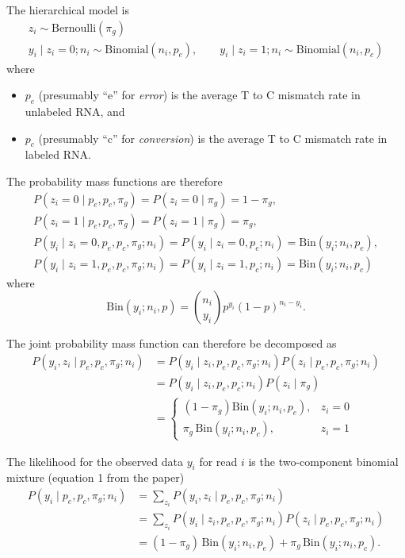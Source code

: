 \documentclass[11pt]{article}
\begin{document}
The hierarchical model is
\[
\begin{gathered}
z_i \sim \mathrm{Bernoulli}(\pi_g) \\
y_i \mid z_i=0; n_i \sim \mathrm{Binomial}(n_i,p_e),
\qquad
y_i \mid z_i=1; n_i \sim \mathrm{Binomial}(n_i,p_c)
\end{gathered}
\]
where \begin{itemize}
    \item $p_e$ (presumably ``e'' for \emph{error}) is the average T to C mismatch rate in unlabeled RNA, and
    \item $p_c$ (presumably ``c'' for \emph{conversion}) is the average T to C mismatch rate in labeled RNA.
\end{itemize}
The probability mass functions are therefore
\[
\begin{gathered}
P(z_i = 0 \mid p_e, p_c, \pi_g) = P(z_i = 0 \mid \pi_g) = 1 - \pi_g, \\
P(z_i = 1 \mid p_e, p_c, \pi_g) = P(z_i = 1 \mid \pi_g) = \pi_g, \\
P(y_i \mid z_i = 0, p_e, p_c, \pi_g; n_i) = P(y_i \mid z_i = 0, p_e; n_i) = \mathrm{Bin}(y_i; n_i, p_e), \\
P(y_i \mid z_i = 1, p_e, p_c, \pi_g; n_i) = P(y_i \mid z_i = 1, p_c; n_i) = \mathrm{Bin}(y_i; n_i, p_c)
\end{gathered}
\]
where
\[
\mathrm{Bin}(y_i;n_i,p) = \binom{n_i}{y_i} p^{y_i} (1 - p)^{n_i - y_i}.
\]

The joint probability mass function can therefore be decomposed as
\[
\begin{aligned}
P(y_i, z_i \mid p_e, p_c, \pi_g; n_i)
&= P(y_i \mid z_i, p_e, p_c, \pi_g; n_i) P(z_i \mid p_e, p_c, \pi_g; n_i) \\
&= P(y_i \mid z_i, p_e, p_c; n_i) P(z_i \mid \pi_g) \\
&= \begin{cases}
    (1 - \pi_g) \mathrm{Bin}(y_i; n_i, p_e), & z_i = 0 \\
    \pi_g \, \mathrm{Bin}(y_i; n_i, p_c), & z_i = 1
\end{cases}
\end{aligned}
\]

The likelihood for the observed data $y_i$ for read $i$ is the two-component binomial mixture (equation 1 from the paper)
\[
\begin{aligned}
P(y_i \mid p_e, p_c, \pi_g; n_i)
&=
\sum_{z_i} P(y_i, z_i \mid p_e, p_c, \pi_g; n_i) \\
&=
\sum_{z_i} P(y_i \mid z_i, p_e, p_c, \pi_g; n_i) P(z_i \mid p_e, p_c, \pi_g; n_i) \\
&= 
(1 - \pi_g)\,\mathrm{Bin}(y_i;n_i,p_e)
+ \pi_g\,\mathrm{Bin}(y_i;n_i,p_c).
\end{aligned}
\]
\end{document}
